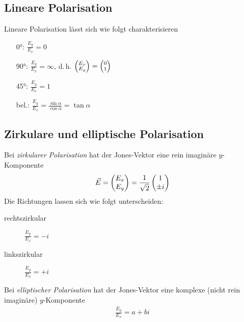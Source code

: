 \subsection{Lineare Polarisation}
Lineare Polarisation lässt sich wie folgt charakterisieren
\begin{itemize}
\item[\ang{0}:] $\frac{E_y}{E_x} = 0$
\item[\ang{90}:] $\frac{E_y}{E_x} = \infty$, d.\,h.
  $\scriptsize\begin{pmatrix}E_x\\E_y\end{pmatrix}
  = \begin{pmatrix}0\\1\end{pmatrix}$
\item[\ang{45}:] $\frac{E_y}{E_x} = 1$
\item[bel.:] 
  $\frac{E_y}{E_x} = \frac{\sin\alpha}{\cos\alpha} = \tan\alpha$
\end{itemize}

\subsection{Zirkulare und elliptische Polarisation}
Bei \emph{zirkularer Polarisation}
hat der Jones-Vektor eine rein imaginäre
$y$-Komponente
\begin{gather*}
  \vec{E} = \begin{pmatrix}E_x\\E_y\end{pmatrix} 
  = \frac{1}{\sqrt{2}}\begin{pmatrix}1\\\pm i\end{pmatrix}
\end{gather*}
Die Richtungen lassen sich wie folgt unterscheiden:
\begin{description}
\item[rechtszirkular] $\frac{E_y}{E_x}=-i$
\item[linkszirkular] $\frac{E_y}{E_x}=+i$
\end{description}

Bei \emph{elliptischer Polarisation}
hat der Jones-Vektor eine komplexe (nicht rein imaginäre)
$y$-Komponente
\begin{gather*}
  \frac{E_y}{E_x} = a+bi
\end{gather*}


